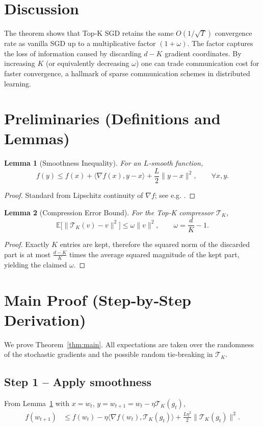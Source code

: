 \documentclass{article}
\newtheorem{lemma}{Lemma}
\newcommand{\TopK}{\mathcal{T}_K}
\newcommand{\E}{\mathbb{E}}
\begin{document}
\section*{Discussion}
The theorem shows that Top‑K SGD retains the same $O(1/\sqrt{T})$ convergence rate as vanilla SGD up to a multiplicative factor $(1+\omega)$. The factor captures the loss of information caused by discarding $d-K$ gradient coordinates. By increasing $K$ (or equivalently decreasing $\omega$) one can trade communication cost for faster convergence, a hallmark of sparse communication schemes in distributed learning.

\newpage
\section*{Preliminaries (Definitions and Lemmas)}
\begin{lemma}[Smoothness Inequality]
\label{lem:smooth}
For an $L$‑smooth function,
\[
f(y)\le f(x)+\langle\nabla f(x),y-x\rangle+\frac{L}{2}\|y-x\|^{2},\qquad\forall x,y.
\]
\end{lemma}
\begin{proof}
Standard from Lipschitz continuity of $\nabla f$; see e.g. \cite{Nesterov2004}.
\end{proof}

\begin{lemma}[Compression Error Bound]
\label{lem:compress}
For the Top‑K compressor $\TopK$,
\[
\E\!\big[\|\TopK(v)-v\|^{2}\big]\le\omega\|v\|^{2},\qquad
\omega=\frac{d}{K}-1.
\]
\end{lemma}
\begin{proof}
Exactly $K$ entries are kept, therefore the squared norm of the discarded part is at most $\frac{d-K}{K}$ times the average squared magnitude of the kept part, yielding the claimed $\omega$.
\end{proof}

\section*{Main Proof (Step‑by‑Step Derivation)}
We prove Theorem~\ref{thm:main}. All expectations are taken over the randomness of the stochastic gradients and the possible random tie‑breaking in $\TopK$.

\subsection*{Step 1 – Apply smoothness}
From Lemma~\ref{lem:smooth} with $x=w_t$, $y=w_{t+1}=w_t-\eta\TopK(g_t)$,
\begin{align}
f(w_{t+1})
&\le f(w_t)-\eta\langle\nabla f(w_t),\TopK(g_t)\rangle
      +\frac{L\eta^{2}}{2}\|\TopK(g_t)\|^{2}.
\tag{Step 1}
\end{align}
\end{document}
